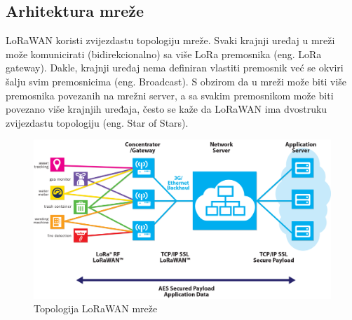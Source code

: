 \subsection{Arhitektura mreže}
\label{subsection:lorawan_network_arh}
LoRaWAN koristi zvijezdastu topologiju mreže. Svaki krajnji uređaj u mreži može komunicirati (bidirekcionalno) sa više LoRa premosnika (eng. LoRa gateway). Dakle, krajnji uređaj nema definiran vlastiti premosnik već se okviri šalju svim premosnicima (eng. Broadcast). S obzirom da u mreži može biti više premosnika povezanih na mrežni server, a sa svakim premosnikom može biti povezano više krajnjih uređaja, često se kaže da LoRaWAN ima dvostruku zvijezdastu topologiju (eng. Star of Stars).
\begin{figure}[ht!]
	\centering
	\includegraphics[width=1.0\textwidth]{images/lorawan_network.png}
	\caption{Topologija LoRaWAN mreže}
	\label{img:bands}
\end{figure}

